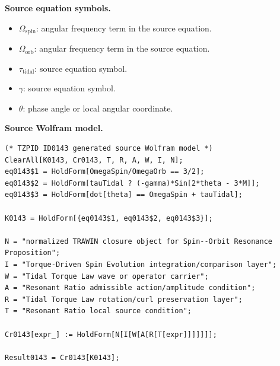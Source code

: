 \begin{minipage}[t]{0.49\linewidth}
\begingroup
\small
\raggedright
\textbf{Source equation symbols.}\par
\begin{itemize}[leftmargin=1.35em,itemsep=1pt,topsep=1pt,parsep=0pt]
    \item $\Omega_{\mathrm{spin}}$: angular frequency term in the source equation.
    \item $\Omega_{\mathrm{orb}}$: angular frequency term in the source equation.
    \item $\tau_{\mathrm{tidal}}$: source equation symbol.
    \item $\gamma$: source equation symbol.
    \item $\theta$: phase angle or local angular coordinate.
\end{itemize}
\endgroup
\end{minipage}\hfill
\begin{minipage}[t]{0.47\linewidth}
\begingroup
\scriptsize
\raggedright
\textbf{Source Wolfram model.}\par
\begin{Verbatim}[fontsize=\tiny,breaklines=true,breakanywhere=true]
(* TZPID ID0143 generated source Wolfram model *)
ClearAll[K0143, Cr0143, T, R, A, W, I, N];
eq0143$1 = HoldForm[OmegaSpin/OmegaOrb == 3/2];
eq0143$2 = HoldForm[tauTidal ? (-gamma)*Sin[2*theta - 3*M]];
eq0143$3 = HoldForm[dot[theta] == OmegaSpin + tauTidal];

K0143 = HoldForm[{eq0143$1, eq0143$2, eq0143$3}];

N = "normalized TRAWIN closure object for Spin--Orbit Resonance Proposition";
I = "Torque-Driven Spin Evolution integration/comparison layer";
W = "Tidal Torque Law wave or operator carrier";
A = "Resonant Ratio admissible action/amplitude condition";
R = "Tidal Torque Law rotation/curl preservation layer";
T = "Resonant Ratio local source condition";

Cr0143[expr_] := HoldForm[N[I[W[A[R[T[expr]]]]]]];

Result0143 = Cr0143[K0143];
\end{Verbatim}
\endgroup
\end{minipage}


